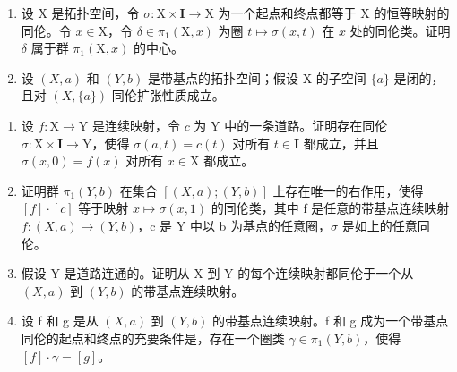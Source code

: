 \exercisegroup

\begin{enumerate}
\def\labelenumi{\arabic{enumi})}
\item
  设 X 是拓扑空间，令 \(\sigma: \mathrm{X} \times \mathbf{I} \to \mathrm{X}\) 为一个起点和终点都等于 X 的恒等映射的同伦。令 \(x \in \mathrm{X}\)，令 \(\delta \in \pi_1(\mathrm{X}, x)\) 为圈 \(t \mapsto \sigma(x, t)\) 在 \(x\) 处的同伦类。证明 \(\delta\) 属于群 \(\pi_1(\mathrm{X}, x)\) 的中心。
\item
  设 \((X, a)\) 和 \((Y, b)\) 是带基点的拓扑空间；假设 X 的子空间 \(\{a\}\) 是闭的，且对 \((X, \{a\})\) 同伦扩张性质成立。
\end{enumerate}

\begin{enumerate}
\def\labelenumi{\alph{enumi})}
\item
  设 \(f \colon \mathrm{X} \to \mathrm{Y}\) 是连续映射，令 \(c\) 为 Y 中的一条道路。证明存在同伦 \(\sigma \colon \mathrm{X} \times \mathbf{I} \to \mathrm{Y}\)，使得 \(\sigma(a, t) = c(t)\) 对所有 \(t \in \mathbf{I}\) 都成立，并且 \(\sigma(x, 0) = f(x)\) 对所有 \(x \in \mathrm{X}\) 都成立。
\item
  证明群 \(\pi_{1}(Y,b)\) 在集合 \([(X,a);(Y,b)]\) 上存在唯一的右作用，使得 \([f]\cdot[c]\) 等于映射 \(x\mapsto\sigma(x,1)\) 的同伦类，其中 f 是任意的带基点连续映射 \(f\colon(X,a)\to(Y,b)\)，c 是 Y 中以 b 为基点的任意圈，\(\sigma\) 是如上的任意同伦。
\item
  假设 Y 是道路连通的。证明从 X 到 Y 的每个连续映射都同伦于一个从 \((X, a)\) 到 \((Y, b)\) 的带基点连续映射。
\item
  设 f 和 g 是从 \((X, a)\) 到 \((Y, b)\) 的带基点连续映射。f 和 g 成为一个带基点同伦的起点和终点的充要条件是，存在一个圈类 \(\gamma \in \pi_{1}(Y, b)\)，使得 \([f] \cdot \gamma = [g]\)。
\end{enumerate}

